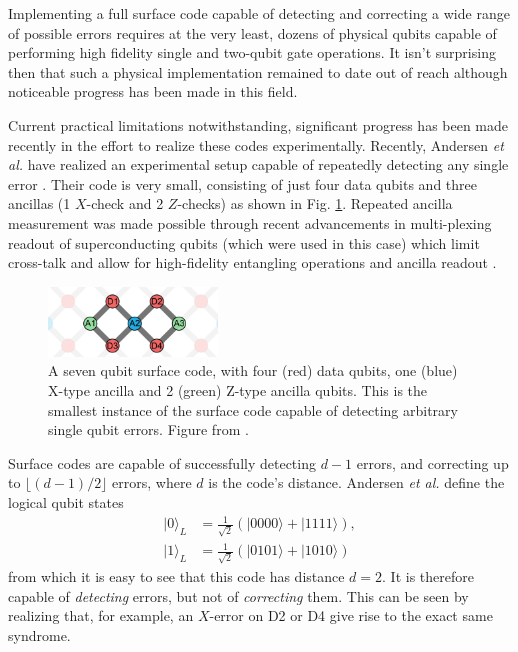 Implementing a full surface code capable of detecting and correcting a wide
range of possible errors requires at the very least, dozens of physical qubits
capable of performing high fidelity single and two-qubit gate operations. It
isn't surprising then that such a physical implementation remained to date out
of reach although noticeable progress has been made in this field.

Current practical limitations notwithstanding, significant progress has been
made recently in the effort to realize these codes experimentally. Recently,
Andersen \textit{et al.} have realized an experimental setup capable of
repeatedly detecting any single error \cite{Andersen_2020}. Their code is very
small, consisting of just four data qubits and three ancillas (1 $X$-check and 2
$Z$-checks) as shown in Fig. \ref{fig:seven_qbit_code}. Repeated ancilla
measurement was made possible through recent advancements in multi-plexing
readout of superconducting qubits (which were used in this case) which limit
cross-talk and allow for high-fidelity entangling operations and ancilla readout
\cite{barends14_super_quant_circuit_at_surfac} \cite{Bultink_2020}.

\begin{figure}[h]
  \centering
  \includegraphics[width=0.4\textwidth]{images/seven_qbit_code.pdf}
  \caption{A seven qubit surface code, with four (red) data qubits, one (blue)
    X-type ancilla and 2 (green) Z-type ancilla qubits. This is the smallest
    instance of the surface code capable of detecting arbitrary single qubit
    errors. Figure from \cite{Andersen_2020}.}
  \label{fig:seven_qbit_code}
\end{figure}

Surface codes are capable of successfully detecting $d-1$ errors, and correcting
up to $\lfloor{(d-1)/2} \rfloor$ errors, where $d$ is the code's distance.
Andersen \textit{et al.} define the logical qubit states
\begin{align}
|0\rangle_L &= \frac{1}{\sqrt{2}} (|0000\rangle + |1111\rangle) , \\
|1\rangle_L &= \frac{1}{\sqrt{2}} (|0101\rangle + |1010\rangle) 
\end{align}
from which it is easy to see that this code has distance $d=2$. It is therefore
capable of \textit{detecting} errors, but not of \textit{correcting} them. This
can be seen by realizing that, for example, an $X$-error on D2 or D4 give rise
to the exact same syndrome.


